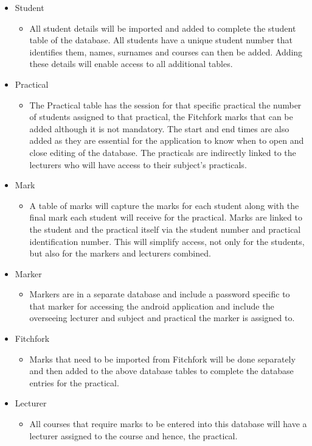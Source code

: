 \documentclass[12pt]{article}
\begin{document}
		\begin{itemize}
			\item{Student}
				\begin{itemize}
				\item All student details will be imported and added to complete the student table of the database. All students have a unique student number that identifies them, names, surnames and courses can then be added. Adding these details will enable access to all additional tables.
				\end{itemize}
			
			\item{Practical}
				\begin{itemize}
				\item The Practical table has the session for that specific practical the number of students assigned to that practical, the Fitchfork marks that can be added although it is not mandatory. The start and end times are also added as they are essential for the application to know when to open and close editing of the database. The practicals are indirectly linked to the lecturers who will have access to their subject’s practicals.
				\end{itemize}
			
			\item{Mark}
				\begin{itemize}
				\item A table of marks will capture the marks for each student along with the final mark each student will receive for the practical. Marks are linked to the student and the practical itself via the student number and practical identification number. This will simplify access, not only for the students, but also for the markers and lecturers combined.
				\end{itemize}
			
			\item{Marker}
				\begin{itemize}
				\item Markers are in a separate database and include a password specific to that marker for accessing the android application and include the overseeing lecturer and subject and practical the marker is assigned to.
				\end{itemize}
			
			\item{Fitchfork}
				\begin{itemize}
				\item Marks that need to be imported from Fitchfork will be done separately and then added to the above database tables to complete the database entries for the practical. \\
				\end{itemize}
			
			\item{Lecturer}
				\begin{itemize}
				\item All courses that require marks to be entered into this database will have a lecturer assigned to the course and hence, the practical.
				\end{itemize}
		\end{itemize}
	
\end{document}
